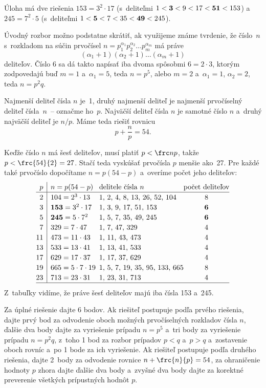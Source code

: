 {\odpoved
Úloha má dve riešenia $153 = 3^2 \cdot 17$ (s~deliteľmi
$1 <\bold{3} <9 <17 <\bold{51} <153$) a~$245 = 7^2 \cdot 5$ (s~deliteľmi
$1 <\bold{5} <7 <35 <\bold{49} <245$).

\poznamka
Úvodný rozbor možno podstatne skrátiť, ak využijeme známe tvrdenie, že číslo~$n$
s~rozkladom na súčin prvočísel
$n = p_1^{\alpha_1} p_2^{\alpha_2}\dots p_m^{\alpha_m}$ má práve
$$
(\alpha_1+1)(\alpha_2+1)\dots(\alpha_m+1)
$$
deliteľov. Číslo 6 sa dá takto napísať iba dvoma spôsobmi $6 = 2 \cdot 3$,
ktorým zodpovedajú buď $m = 1$ a~$\alpha_1 = 5$, teda $n=p^5$, alebo $m = 2$
a~$\alpha_1=1$, $\alpha_2=2$, teda $n=p^2q$.


\ineriesenie
Najmenší deliteľ čísla $n$ je~1, druhý najmenší deliteľ je najmenší
prvočíselný deliteľ čísla~$n$~-- označme ho~$p$.
Najväčší deliteľ čísla $n$ je samotné číslo $n$ a~druhý najväčší
deliteľ je $n / p$. Máme teda riešiť rovnicu
$$
p+\frac {n} {p} = 54.
$$

Keďže číslo $n$ má šesť deliteľov, musí platiť $p <\frc np$, takže
$p <\frc {54} {2} = 27$. Stačí teda vyskúšať prvočísla $p$ menšie ako~27.
Pre každé také prvočíslo dopočítame $n = p (54-p)$ a~overíme počet
jeho deliteľov:
$$
\vbox{\offinterlineskip\let\\=\cr %
\halign{\strut\hss#\unskip\enspace \vrule &\enspace #\unskip\hss&\quad#\unskip\hss&\hss#\unskip\hss \\
$p$& $n = p (54-p)$ &delitele čísla $n$ &počet deliteľov \\
\noalign{\hrule}
2 & $104 = 2^3 \cdot 13$ &1, 2, 4, 8, 13, 26, 52, 104 &8 \\
3 & $\bold{153} = 3^2 \cdot 17$ &1, 3, 9, 17, 51, 153 &$\bold 6$ \\
5 & $\bold{245} = 5 \cdot 7^2$ &1, 5, 7, 35, 49, 245 &$\bold 6$ \\
7 & $329 = 7 \cdot 47$ &1, 7, 47, 329 &4 \\
11 & $473 = 11 \cdot 43$ &1, 11, 43, 473 &4 \\
13 & $533 = 13 \cdot 41$ &1, 13, 41, 533 &4 \\
17 & $629 = 17 \cdot 37$ &1, 17, 37, 629 &4 \\
19 & $665 = 5 \cdot 7 \cdot 19$ &1, 5, 7, 19, 35, 95, 133, 665 &8 \\
23 & $713 = 23 \cdot 31$ &1, 23, 31, 713 &4 \\
\noalign{\hrule}
}}
$$
Z~tabuľky vidíme, že práve šesť deliteľov majú iba čísla 153 a~245.


\nobreak\medskip\petit\noindent
Za úplné riešenie dajte 6 bodov.
Ak riešiteľ postupuje podľa prvého riešenia, dajte prvý bod za odvodenie
oboch možných prvočíselných rozkladov čísla $n$, ďalšie dva body dajte za vyriešenie
prípadu $n = p^5$ a~tri body za vyriešenie prípadu $n = p^2q$,
z~toho 1 bod za rozbor prípadov $p<q$ a~$p>q$ a~zostavenie oboch
rovníc a~po 1 bode za ich vyriešenie.
Ak riešiteľ postupuje podľa druhého riešenia, dajte 2~body
za odvodenie rovnice $n+\frc {n}{p} = 54$, za ohraničenie hodnoty $p$ zhora
dajte ďalšie dva body a~zvyšné dva body dajte za korektné preverenie
všetkých prípustných hodnôt $p$.

\endpetit
\bigbreak
}

